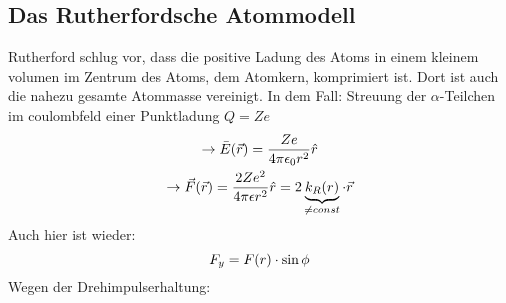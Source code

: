 \subsection{Das Rutherfordsche Atommodell} %
\label{sub:Das_Rutherfordsche_Atommodell}
Rutherford schlug vor, dass die positive Ladung des Atoms in einem kleinem
volumen im Zentrum des Atoms, dem Atomkern, komprimiert ist. Dort ist auch die
nahezu gesamte Atommasse vereinigt. In dem Fall: Streuung der $\alpha$-Teilchen
im coulombfeld einer Punktladung $Q = Ze$
\begin{gather*}
    \rightarrow \bar{E} (\vec{r}) = \frac{Ze}{4\pi \epsilon_0 r^2} \hat{r} \\
    \rightarrow \vec{F}(\vec{r}) = \frac{2Ze^2}{4 \pi \epsilon r^2} \hat{r}
    = 2 \underbrace{k_R (r)}_{\neq const} \cdot \vec{r}
\end{gather*}
Auch hier ist wieder:
\begin{equation*}
    F_y = F(r) \cdot \sin \phi
\end{equation*}
Wegen der Drehimpulserhaltung:
